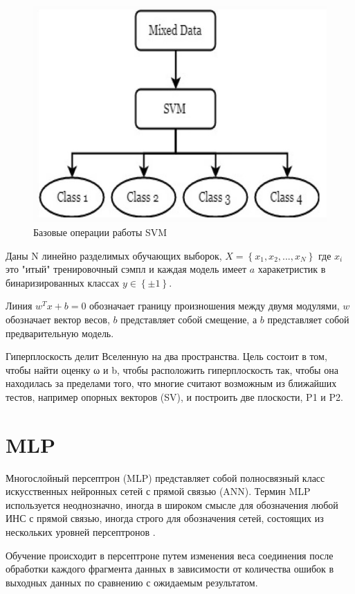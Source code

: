 \begin{figure}[h]
\includegraphics[width=0.75\columnwidth]{./img/svm_diagramma.jpg}
\centering
\caption{Базовые операции работы SVM}
\label{pic:svm_diagramma}
\end{figure}

Даны N линейно разделимых обучающих выборок, $X = \left \{ x_1, x_2, ..., x_N \right \}$ 
где $x_i$ это "итый" тренировочный сэмпл и каждая модель имеет $a$ харакетристик в 
бинаризированных классах $y \in \left \{ \pm 1 \right \}$. 

Линия $w^T x + b = 0$ обозначает границу произношения между двумя модулями, 
$w$ обозначает вектор весов, $b$ представляет собой смещение, 
а $b$ представляет собой предварительную модель.

Гиперплоскость делит Вселенную на два пространства. 
Цель состоит в том, чтобы найти оценку ω и b, 
чтобы расположить гиперплоскость так, чтобы она находилась 
за пределами того, что многие считают возможным из ближайших тестов, 
например опорных векторов (SV), и построить две плоскости, P1 и P2.

\section{MLP}
Многослойный персептрон (MLP) представляет собой полносвязный класс искусственных нейронных сетей с прямой связью (ANN). 
Термин MLP используется неоднозначно, иногда в широком смысле для обозначения любой ИНС с прямой связью, иногда 
строго для обозначения сетей, состоящих из нескольких уровней персептронов \cite{wiki_mlp}.

Обучение происходит в персептроне путем изменения веса соединения после обработки каждого фрагмента
данных в зависимости от количества ошибок в выходных данных по сравнению с ожидаемым результатом.

